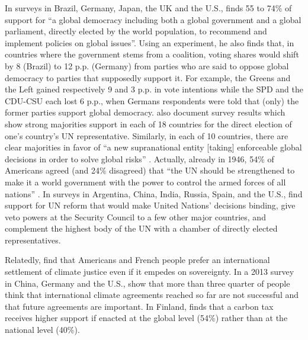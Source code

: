 In surveys in Brazil, Germany, Japan, the UK and the U.S., \citet{ghassim_who_2020} finds 55 to 74\% of support for ``a global democracy including both a global government and a global parliament, directly elected by the world population, to recommend and implement policies on global issues''. %
Using an experiment, he also finds that, in countries where the government stems from a coalition, voting shares would shift by 8 (Brazil) to 12 p.p. (Germany) from parties who are said to oppose global democracy to parties that supposedly support it. For example, the Greens and the Left gained respectively 9 and 3 p.p. in vote intentions while the SPD and the CDU-CSU each lost 6 p.p., when Germans respondents were told that (only) the former parties support global democracy. 
\citet{ghassim_who_2020} also document survey results which show strong majorities support in each of 18 countries for the direct election of one's country's UN representative. %
Similarly, in each of 10 countries, there are clear majorities in favor of ``a new supranational entity [taking] enforceable global decisions in order to solve global risks'' \citep{global_challenges_foundation_attitudes_2018}. Actually, already in 1946, 54\% of Americans agreed (and 24\% disagreed) that ``the UN should be strengthened to make it a world government with the power to control the armed forces of all nations'' \citep{gallup_seventy_1946}. 
In surveys in Argentina, China, India, Russia, Spain, and the U.S., \citet{ghassim_public_2022} find support for UN reform that would make United Nations' decisions binding, give veto powers at the Security Council to a few other major countries, and complement the highest body of the UN with a chamber of directly elected representatives. 

Relatedly, \citet{meilland_international_2023} find that Americans and French people prefer an international settlement of climate justice even if it empedes on sovereignty. In a 2013 survey in China, Germany and the U.S., \citet{schleich_citizens_2016} show that more than three quarter of people think that international climate agreements reached so far are not successful and that future agreements are important. %
In Finland, \citet{sivonen_attitudes_2022} finds that a carbon tax receives higher support if enacted at the global level (54\%) rather than at the national level (40\%).

